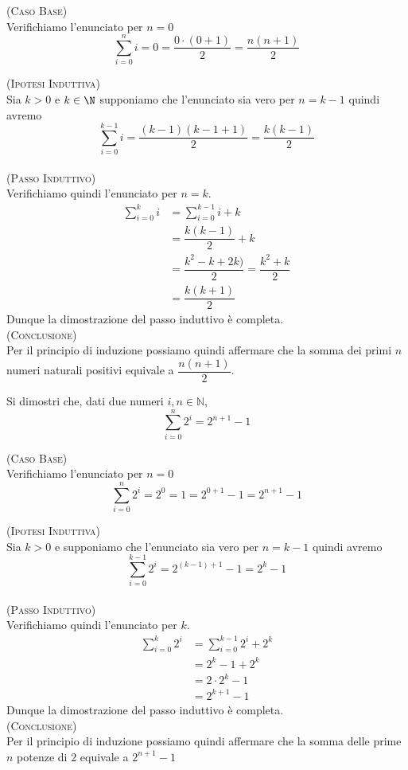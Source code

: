 \begin{soluzione}
\textsc{(Caso Base)}\\
Verifichiamo l'enunciato per $n=0$
$$\sum\limits_{i=0}^{n} i = 0 = \dfrac{0\cdot(0+1)}{2} = \dfrac{n(n+1)}{2}$$


\textsc{(Ipotesi Induttiva)}\\
Sia $k>0$ e $k\in\N$ supponiamo che l'enunciato sia vero per $n=k-1$ quindi avremo 
$$\sum\limits_{i=0}^{k-1} i = \dfrac{(k-1)(k-1+1)}{2}=\dfrac{k(k-1)}{2}$$\\

\textsc{(Passo Induttivo)}\\
Verifichiamo quindi l'enunciato per $n=k$. 
\begin{align*}
\sum\limits_{i=0}^{k} i &= \sum\limits_{i=0}^{k-1} i + k\\
&= \dfrac{k(k-1)}{2} + k\\
&= \dfrac{k^2-k+2k)}{2} = \dfrac{k^2+k}{2}\\
&= \dfrac{k(k+1)}{2}
\end{align*}
Dunque la dimostrazione del passo induttivo è completa.\\

\textsc{(Conclusione)}\\
Per il principio di induzione possiamo quindi affermare che la somma dei primi $n$ numeri naturali positivi equivale a $\dfrac{n(n+1)}{2}$. \\
\end{soluzione}


\begin{esercizio}
Si dimostri che,  dati due numeri $i,n\in\mathbb{N}$, $$\sum\limits_{i=0}^{n} 2^i = 2^{n+1}-1$$
\end{esercizio}

\begin{soluzione}
\textsc{(Caso Base)}\\
Verifichiamo l'enunciato per $n=0$
$$\sum\limits_{i=0}^n 2^i = 2^0 = 1 = 2^{0+1} - 1 = 2^{n+1}-1$$


\textsc{(Ipotesi Induttiva)}\\
Sia $k>0$ e supponiamo che l'enunciato sia vero per $n=k-1$ quindi avremo 
$$\sum\limits_{i=0}^{k-1} 2^i=2^{(k-1)+1}-1=2^k-1$$\\

\textsc{(Passo Induttivo)}\\
Verifichiamo quindi l'enunciato per $k$. 
\begin{align*}
\sum\limits_{i=0}^k 2^i &= \sum\limits_{i=0}^{k-1}2^i+2^k\\
&= 2^k-1+2^k\\
&= 2\cdot 2^k -1\\
&= 2^{k+1}-1
\end{align*}
Dunque la dimostrazione del passo induttivo è completa.\\

\textsc{(Conclusione)}\\
Per il principio di induzione possiamo quindi affermare che la somma delle prime $n$ potenze di $2$ equivale a $2^{n+1}-1$ \\
\end{soluzione}

